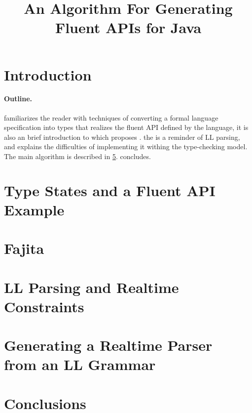 \documentclass[nonatbib,preprint,numbers]{sigplanconf}
\title
{%
  An Algorithm For Generating Fluent APIs for  Java 
}
\begin{document}
\maketitle

\begin{abstract}
  
\end{abstract}

\section{Introduction}


\paragraph{Outline.}  familiarizes the reader with
techniques of converting a formal language specification into \Java types that
realizes the fluent API defined by the language, it is also an brief introduction to
 which proposes \Fajita.  the is
a reminder of LL parsing, and explains the difficulties of implementing it
withing the \Java type-checking model.  The main algorithm is described in
\cref{section:algorithm}.   concludes.

\section{Type States and a Fluent API Example}
\label{section:example}


\section{Fajita}
\label{section:fajita}
%

\section{LL Parsing and Realtime Constraints}
\label{section:intuition}


\section{Generating a Realtime Parser \\ from an LL Grammar}
\label{section:algorithm}


\section{Conclusions}
\label{section:zz}


\small

\end{document}
